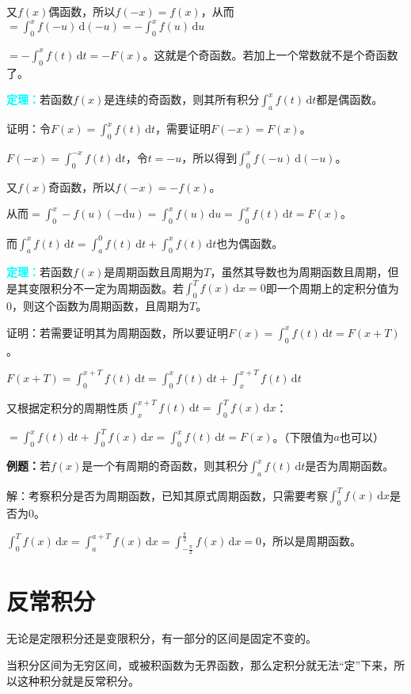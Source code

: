 \documentclass[UTF8, 12pt]{ctexart}
\begin{document}
又$f(x)$偶函数，所以$f(-x)=f(x)$，从而$=\int_0^xf(-u)\,\textrm{d}(-u)=-\int_0^xf(u)\,\textrm{d}u$

$=-\int_0^xf(t)\,\textrm{d}t=-F(x)$。这就是个奇函数。若加上一个常数就不是个奇函数了。

\textcolor{aqua}{\textbf{定理：}}若函数$f(x)$是连续的奇函数，则其所有积分$\int^x_af(t)\,\textrm{d}t$都是偶函数。

证明：令$F(x)=\int_0^xf(t)\,\textrm{d}t$，需要证明$F(-x)=F(x)$。

$F(-x)=\int_0^{-x}f(t)\,\textrm{d}t$，令$t=-u$，所以得到$\int_0^xf(-u)\,\textrm{d}(-u)$。

又$f(x)$奇函数，所以$f(-x)=-f(x)$。

从而$=\int_0^x-f(u)(-\textrm{d}u)=\int_0^xf(u)\,\textrm{d}u=\int_0^xf(t)\,\textrm{d}t=F(x)$。

而$\int_a^xf(t)\,\textrm{d}t=\int_a^0f(t)\,\textrm{d}t+\int_0^xf(t)\,\textrm{d}t$也为偶函数。

\textcolor{aqua}{\textbf{定理：}}若函数$f(x)$是周期函数且周期为$T$，虽然其导数也为周期函数且周期，但是其变限积分不一定为周期函数。若$\int_0^Tf(x)\,\textrm{d}x=0$即一个周期上的定积分值为0，则这个函数为周期函数，且周期为$T$。

证明：若需要证明其为周期函数，所以要证明$F(x)=\int_0^xf(t)\,\textrm{d}t=F(x+T)$。

$F(x+T)=\int_0^{x+T}f(t)\,\textrm{d}t=\int_0^xf(t)\,\textrm{d}t+\int_x^{x+T}f(t)\,\textrm{d}t$

又根据定积分的周期性质$\int_x^{x+T}f(t)\,\textrm{d}t=\int_0^Tf(x)\,\textrm{d}x$：

$=\int_0^xf(t)\,\textrm{d}t+\int_0^Tf(x)\,\textrm{d}x=\int_0^xf(t)\,\textrm{d}t=F(x)$。（下限值为$a$也可以）

\textbf{例题：}若$f(x)$是一个有周期的奇函数，则其积分$\int_a^xf(t)\,\textrm{d}t$是否为周期函数。

解：考察积分是否为周期函数，已知其原式周期函数，只需要考察$\int_0^Tf(x)\,\textrm{d}x$是否为0。

$\int_0^Tf(x)\,\textrm{d}x=\int_a^{a+T}f(x)\,\textrm{d}x=\int_{-\frac{\pi}{2}}^{\frac{\pi}{2}}f(x)\,\textrm{d}x=0$，所以是周期函数。

\section{反常积分}

无论是定限积分还是变限积分，有一部分的区间是固定不变的。

当积分区间为无穷区间，或被积函数为无界函数，那么定积分就无法“定”下来，所以这种积分就是反常积分。
\end{document}
